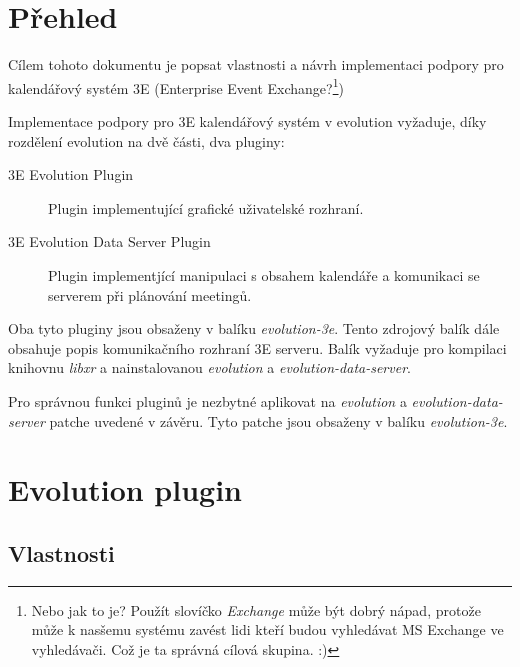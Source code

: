 \documentclass[a4paper,10pt]{article}
\begin{document}

\begin{multicols*}{2}

\section{Přehled}

Cílem tohoto dokumentu je popsat vlastnosti a návrh implementaci podpory pro
kalendářový systém 3E (Enterprise Event Exchange?\footnote{Nebo jak to je?
Použít slovíčko \textit{Exchange} může být dobrý nápad, protože může k nasšemu systému
zavést lidi kteří budou vyhledávat MS Exchange ve vyhledávači. Což je ta správná
cílová skupina. :)})

Implementace podpory pro 3E kalendářový systém v evolution vyžaduje, díky
rozdělení evolution na dvě části, dva pluginy:
\begin{description}
\item[3E Evolution Plugin] Plugin implementující grafické uživatelské rozhraní.
\item[3E Evolution Data Server Plugin] Plugin implementjící manipulaci s obsahem
kalendáře a komunikaci se serverem při plánování meetingů.
\end{description}

Oba tyto pluginy jsou obsaženy v balíku \textit{evolution-3e}. Tento zdrojový
balík dále obsahuje popis komunikačního rozhraní 3E serveru. Balík vyžaduje pro
kompilaci knihovnu \textit{libxr} a nainstalovanou \textit{evolution} a
\textit{evolution-data-server}.

Pro správnou funkci pluginů je nezbytné aplikovat na \textit{evolution} a
\textit{evolution-data-server} patche uvedené v závěru. Tyto patche jsou
obsaženy v balíku \textit{evolution-3e}.

\section{Evolution plugin}

\subsection{Vlastnosti}


\end{multicols*}
\end{document}
